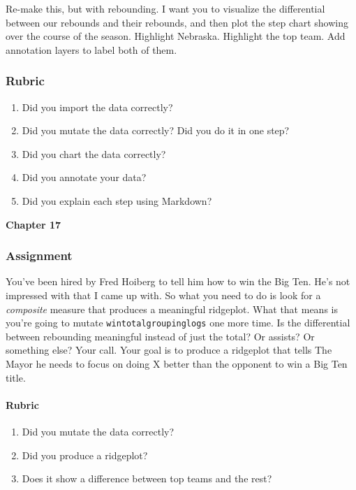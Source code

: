 \documentclass[]{book}
\providecommand{\tightlist}{%
  \setlength{\itemsep}{0pt}\setlength{\parskip}{0pt}}
\let\oldparagraph\paragraph
\renewcommand{\paragraph}[1]{\oldparagraph{#1}\mbox{}}
\begin{document}
Re-make this, but with rebounding. I want you to visualize the
differential between our rebounds and their rebounds, and then plot the
step chart showing over the course of the season. Highlight Nebraska.
Highlight the top team. Add annotation layers to label both of them.

\subsubsection{Rubric}\label{rubric-6}

\begin{enumerate}
\def\labelenumi{\arabic{enumi}.}
\tightlist
\item
  Did you import the data correctly?
\item
  Did you mutate the data correctly? Did you do it in one step?
\item
  Did you chart the data correctly?
\item
  Did you annotate your data?
\item
  Did you explain each step using Markdown?
\end{enumerate}

\textbf{Chapter 17}

\subsubsection{Assignment}\label{assignment-10}

You've been hired by Fred Hoiberg to tell him how to win the Big Ten.
He's not impressed with that I came up with. So what you need to do is
look for a \emph{composite} measure that produces a meaningful
ridgeplot. What that means is you're going to mutate
\texttt{wintotalgroupinglogs} one more time. Is the differential between
rebounding meaningful instead of just the total? Or assists? Or
something else? Your call. Your goal is to produce a ridgeplot that
tells The Mayor he needs to focus on doing X better than the opponent to
win a Big Ten title.

\paragraph{Rubric}\label{rubric-7}

\begin{enumerate}
\def\labelenumi{\arabic{enumi}.}
\tightlist
\item
  Did you mutate the data correctly?
\item
  Did you produce a ridgeplot?
\item
  Does it show a difference between top teams and the rest?
\end{enumerate}
\end{document}
